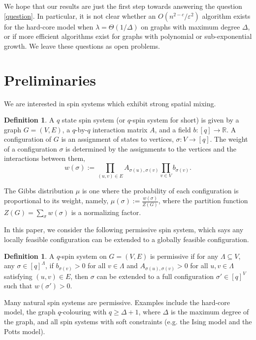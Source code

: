 \documentclass[11pt]{amsart}
\newcommand{\eps}{\varepsilon}
\newcommand{\defeq}{:=}
\theoremstyle{definition}
\newtheorem{definition}[theorem]{Definition}
\theoremstyle{remark}
\begin{document}
We hope that our results are just the first step towards answering the question \eqref{question}.
In particular, it is not clear whether an $O(n^{2-c}/\eps^2)$ algorithm exists for the hard-core model when $\lambda=\Theta(1/\Delta)$ on graphs with maximum degree $\Delta$,
or if more efficient algorithms exist for graphs with polynomial or sub-exponential growth.
We leave these questions as open problems.

\section{Preliminaries}\label{sec:prelim}
We are interested in spin systems which exhibit strong spatial mixing. 

\begin{definition}
  A $q$ state spin system (or $q$-spin system for short) is given by a graph $G=(V,E)$, a $q$-by-$q$ interaction matrix $A$, and a field $b:[q]\rightarrow\mathbb{R}$. A configuration of $G$ is an assignment of states to vertices, $\sigma: V\rightarrow[q]$. The weight of a configuration $\sigma$ is determined by the assignments to the vertices and the interactions between them,
\[w(\sigma)\defeq\prod_{(u,v)\in E}A_{\sigma(u),\sigma(v)}\prod_{v\in V}b_{\sigma(v)}.\]

The Gibbs distribution $\mu$ is one where the probability of each configuration is proportional to its weight, namely, $\mu(\sigma)\defeq\frac{w(\sigma)}{Z(G)}$, where the partition function $Z(G)=\sum_\sigma w(\sigma)$ is a normalizing factor. 
\end{definition}

In this paper, we consider the following permissive spin system, which says any locally feasible configuration can be extended to a globally feasible configuration.
\begin{definition}
  A $q$-spin system on $G=(V,E)$ is permissive if for any $\Lambda \subseteq V$, any $\sigma \in [q]^\Lambda$, if $b_{\sigma(v)} > 0$ for all $v \in \Lambda$ and $A_{\sigma(u),\sigma(v)} > 0$ for all $u,v \in \Lambda$ satisfying $(u,v) \in E$, then $\sigma$ can be extended to a full configuration $\sigma' \in [q]^V$ such that $w(\sigma')>0$.
\end{definition}
Many natural spin systems are permissive. Examples include the hard-core model, the graph $q$-colouring with $q \geq \Delta + 1$, where $\Delta$ is the maximum degree of the graph, and all spin systems with soft constraints (e.g. the Ising model and the Potts model).
\end{document}
